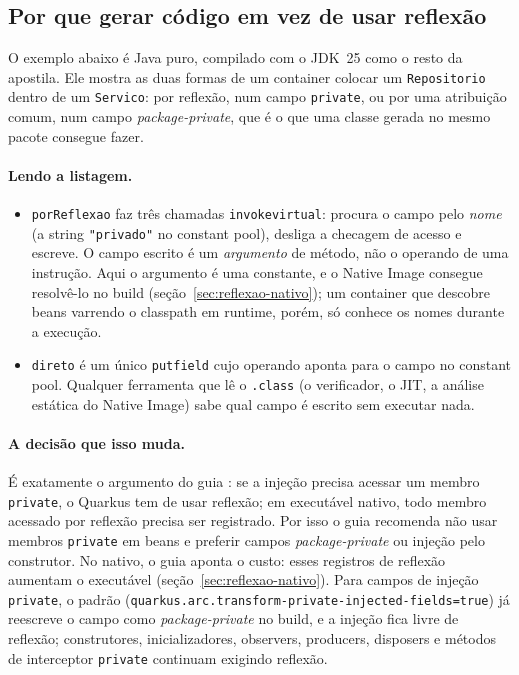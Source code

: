 \subsection*{Por que gerar código em vez de usar reflexão}

O exemplo abaixo é Java puro, compilado com o JDK~25 como o resto da
apostila. Ele mostra as duas formas de um container colocar um
\texttt{Repositorio} dentro de um \texttt{Servico}: por reflexão, num
campo \texttt{private}, ou por uma atribuição comum, num campo
\emph{package-private}, que é o que uma classe gerada no mesmo pacote
consegue fazer.




\paragraph{Lendo a listagem.}
\begin{itemize}
\item \texttt{porReflexao} faz três chamadas \texttt{invokevirtual}:
  procura o campo pelo \emph{nome} (a string \texttt{"privado"} no
  constant pool), desliga a checagem de acesso e escreve. O campo
  escrito é um \emph{argumento} de método, não o operando de uma
  instrução. Aqui o argumento é uma constante, e o Native Image consegue
  resolvê-lo no build (seção~\ref{sec:reflexao-nativo}); um container
  que descobre beans varrendo o classpath em runtime, porém, só conhece
  os nomes durante a execução.
\item \texttt{direto} é um único \texttt{putfield} cujo operando aponta
  para o campo no constant pool. Qualquer ferramenta que lê o
  \texttt{.class} (o verificador, o JIT, a análise estática do Native
  Image) sabe qual campo é escrito sem executar nada.
\end{itemize}

\paragraph{A decisão que isso muda.}
É exatamente o argumento do guia :
se a injeção precisa acessar um membro \texttt{private}, o Quarkus tem de
usar reflexão; em executável nativo, todo membro acessado por reflexão
precisa ser registrado. Por isso o guia recomenda não usar membros
\texttt{private} em beans e preferir campos \emph{package-private} ou
injeção pelo construtor. No nativo, o guia aponta o custo: esses registros
de reflexão aumentam o executável (seção~\ref{sec:reflexao-nativo}). Para
campos de injeção \texttt{private}, o padrão
(\texttt{quarkus.arc.transform-private-injected-fields=true}) já reescreve o
campo como \emph{package-private} no build, e a injeção fica livre de
reflexão; construtores, inicializadores, observers, producers, disposers e
métodos de interceptor \texttt{private} continuam exigindo reflexão.

